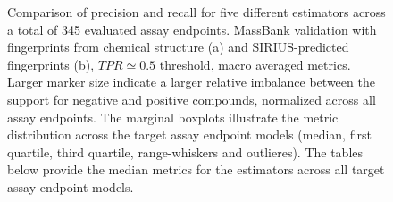 \begin{figure}
\begin{subfigure}[b]{0.495\textwidth}
      \caption{}
      \label{fig:hitcall_classification_Feature_Selection_XGBClassifier_mb_val_sirius_tpr_macro_avg}
  \end{subfigure}
  \caption{Comparison of precision and recall for five different estimators across a total of 345 evaluated assay endpoints. MassBank validation with fingerprints from chemical structure (a) and SIRIUS-predicted fingerprints (b), $TPR \simeq 0.5$ threshold, macro averaged metrics. Larger marker size indicate a larger relative imbalance between the support for negative and positive compounds, normalized across all assay endpoints. The marginal boxplots illustrate the metric distribution across the target assay endpoint models (median, first quartile, third quartile, range-whiskers and outlieres). The tables below provide the median metrics for the estimators across all target assay endpoint models.}
  \label{fig:hitcall_classification_Feature_Selection_XGBClassifier_mb_val_tpr_macro_avg}
\end{figure}



\newpage

